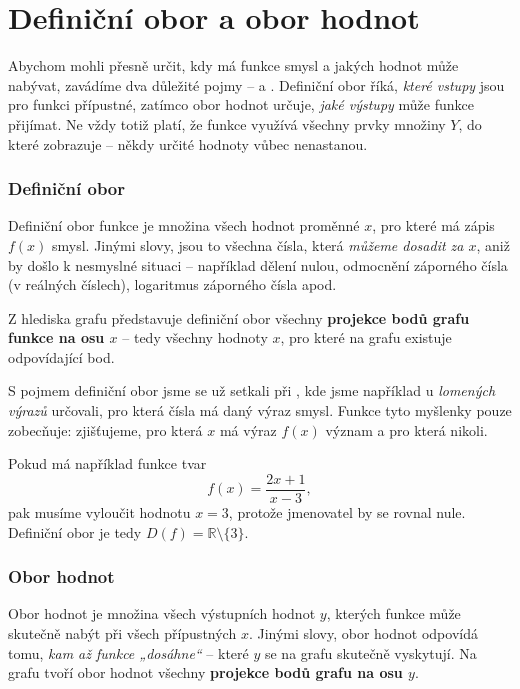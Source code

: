 \documentclass[12pt,a4paper]{article}
\begin{document}
\section{Definiční obor a obor hodnot}

Abychom mohli přesně určit, kdy má funkce smysl a jakých hodnot může nabývat, 
zavádíme dva důležité pojmy –  a .  
Definiční obor říká, \emph{které vstupy} jsou pro funkci přípustné, 
zatímco obor hodnot určuje, \emph{jaké výstupy} může funkce přijímat.  
Ne vždy totiž platí, že funkce využívá všechny prvky množiny \(Y\), 
do které zobrazuje – někdy určité hodnoty vůbec nenastanou.

\subsubsection*{Definiční obor}

Definiční obor funkce je množina všech hodnot proměnné \(x\), pro které má zápis \(f(x)\) smysl.  
Jinými slovy, jsou to všechna čísla, která \emph{můžeme dosadit za \(x\)}, aniž by došlo k nesmyslné situaci – například dělení nulou, odmocnění záporného čísla (v reálných číslech), logaritmus záporného čísla apod.  

Z hlediska grafu představuje definiční obor všechny \textbf{projekce bodů grafu funkce na osu \(x\)} – tedy všechny hodnoty \(x\), pro které na grafu existuje odpovídající bod.

S pojmem definiční obor jsme se už setkali při , kde jsme například u \emph{lomených výrazů} určovali, pro která čísla má daný výraz smysl.  
Funkce tyto myšlenky pouze zobecňuje:  
zjišťujeme, pro která \(x\) má výraz \(f(x)\) význam a pro která nikoli.  

\begin{examplebox}
    Pokud má například funkce tvar
    \[
    f(x) = \frac{2x + 1}{x - 3},
    \]
    pak musíme vyloučit hodnotu \(x = 3\), protože jmenovatel by se rovnal nule.  
    Definiční obor je tedy \(D(f) = \mathbb{R} \setminus \{3\}\).
\end{examplebox}



\subsubsection*{Obor hodnot}

Obor hodnot je množina všech výstupních hodnot \(y\), kterých funkce může skutečně nabýt při všech přípustných \(x\).  
Jinými slovy, obor hodnot odpovídá tomu, \emph{kam až funkce „dosáhne“} – které \(y\) se na grafu skutečně vyskytují.  
Na grafu tvoří obor hodnot všechny \textbf{projekce bodů grafu na osu \(y\)}.
\end{document}
